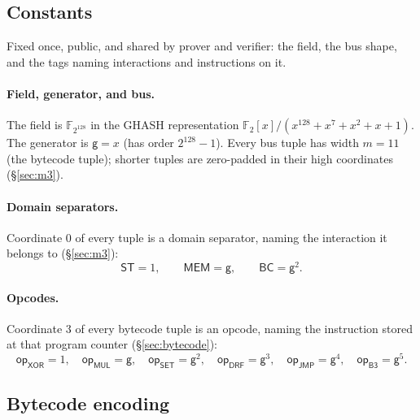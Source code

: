 \documentclass[11pt]{article}
\newcommand{\F}{\mathbb{F}}
\newcommand{\gen}{\mathsf{g}}
\newcommand{\dsep}[1]{\mathsf{#1}}
\newcommand{\opc}[1]{\mathsf{op}_{\mathsf{#1}}}
\begin{document}
\subsection{Constants}\label{sec:e2e-const}

Fixed once, public, and shared by prover and verifier: the field, the bus shape, and the tags naming interactions and instructions on it.

\paragraph{Field, generator, and bus.} The field is $\F_{2^{128}}$ in the GHASH representation $\F_2[x]/(x^{128}+x^7+x^2+x+1)$. The generator is $\gen=x$ (has order $2^{128}-1$). Every bus tuple has width $m=11$ (the bytecode tuple); shorter tuples are zero-padded in their high coordinates (\S\ref{sec:m3}).

\paragraph{Domain separators.} Coordinate $0$ of every tuple is a domain separator, naming the interaction it belongs to (\S\ref{sec:m3}):
\[
  \dsep{ST}=1,\qquad \dsep{MEM}=\gen,\qquad \dsep{BC}=\gen^{2}.
\]

\paragraph{Opcodes.} Coordinate $3$ of every bytecode tuple is an opcode, naming the instruction stored at that program counter (\S\ref{sec:bytecode}):
\[
  \opc{XOR}=1,\quad \opc{MUL}=\gen,\quad \opc{SET}=\gen^{2},\quad \opc{DRF}=\gen^{3},\quad \opc{JMP}=\gen^{4},\quad \opc{B3}=\gen^{5}.
\]

\subsection{Bytecode encoding}\label{sec:e2e-bc}
\end{document}
